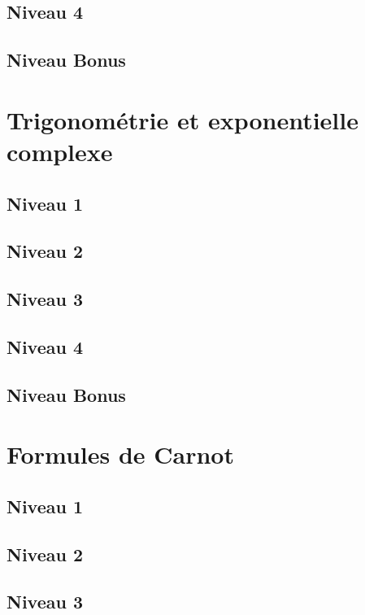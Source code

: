 \documentclass[a4paper]{report}
\begin{document}
			\subsection{Niveau 4}
			
			\subsection{Niveau Bonus}
		
		\section{Trigonométrie et exponentielle complexe}
		
			\subsection{Niveau 1}
		
			\subsection{Niveau 2}
		
			\subsection{Niveau 3}
			
			\subsection{Niveau 4}
			
			\subsection{Niveau Bonus}
		
		\section{Formules de Carnot}
		
			\subsection{Niveau 1}
		
			\subsection{Niveau 2}
		
			\subsection{Niveau 3}
			
\end{document}
